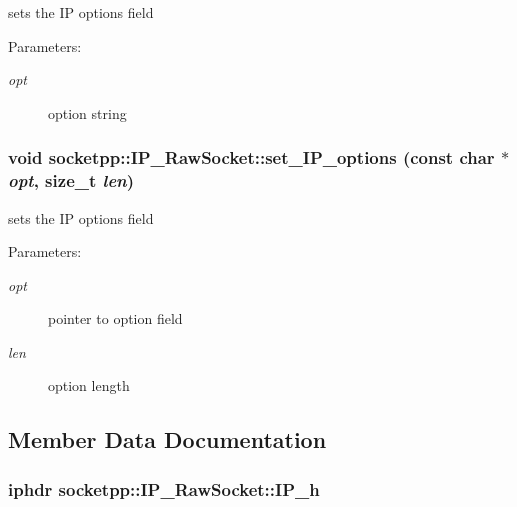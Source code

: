 sets the IP options field 

\begin{Desc}
\item[Parameters:]
\begin{description}
\item[{\em opt}]option string \end{description}
\end{Desc}
\hypertarget{classsocketpp_1_1IP__RawSocket_82c0b2c75d081bc84d8e60bf18199e65}{
\subsubsection[{set\_\-IP\_\-options}]{\setlength{\rightskip}{0pt plus 5cm}void socketpp::IP\_\-RawSocket::set\_\-IP\_\-options (const char $\ast$ {\em opt}, \/  size\_\-t {\em len})}}
\label{classsocketpp_1_1IP__RawSocket_82c0b2c75d081bc84d8e60bf18199e65}


sets the IP options field 

\begin{Desc}
\item[Parameters:]
\begin{description}
\item[{\em opt}]pointer to option field \item[{\em len}]option length \end{description}
\end{Desc}


\subsection{Member Data Documentation}
\hypertarget{classsocketpp_1_1IP__RawSocket_a8ddf1b2172c1e6f4b50d18c825978dc}{
\subsubsection[{IP\_\-h}]{\setlength{\rightskip}{0pt plus 5cm}iphdr {\bf socketpp::IP\_\-RawSocket::IP\_\-h}}}
\label{classsocketpp_1_1IP__RawSocket_a8ddf1b2172c1e6f4b50d18c825978dc}



